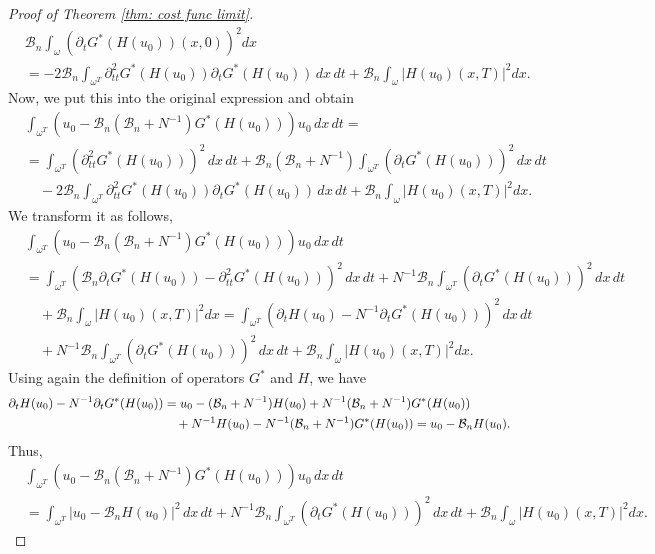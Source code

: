 \documentclass[reqno]{amsart}
\begin{document}
\begin{proof}[Proof of Theorem \ref{thm: cost func limit}]
\begin{align*}
&\mathcal{B}_n\int _{\omega }(\partial _{t}G^{\ast
}(H(u_0))(x,0))^2{dx} \\
&=-2\mathcal{B}_n\int _{\omega ^{T}}\partial _{tt}^2G^{\ast
}(H(u_0))\partial _{t}G^{\ast }(H(u_0))\,dx\,dt + \mathcal{B}_n\int
_{\omega }|H(u_0)(x,T)|^2{dx}.
\end{align*}
Now, we put this into the original expression and obtain
\begin{align*}
&\int _{\omega ^{T}}(u_0-\mathcal{B}_n(\mathcal{B}%
_n+N^{-1})G^{\ast }(H(u_0)))u_0\,dx\,dt= \\
&=\int _{\omega ^{T}}(\partial _{tt}^2G^{\ast }(H(u_0)))^2\,dx\,dt+%
\mathcal{B}_n(\mathcal{B}_n+N^{-1})\int _{\omega ^{T}}(\partial
_{t}G^{\ast }(H(u_0)))^2\,dx\,dt \\
&\quad -2\mathcal{B}_n\int _{\omega ^{T}}\partial _{tt}^2G^{\ast
}(H(u_0))\partial _{t}G^{\ast }(H(u_0))\,dx\,dt +\mathcal{B}_n\int
_{\omega }|H(u_0)(x,T)|^2{dx}.
\end{align*}
We transform it as follows,
\begin{align*}
&\int _{\omega ^{T}}(u_0-\mathcal{B}_n(\mathcal{B}%
_n+N^{-1})G^{\ast }(H(u_0)))u_0\,dx\,dt \\
&=\int _{\omega ^{T}}(\mathcal{B}_n\partial _{t}G^{\ast
}(H(u_0))-\partial _{tt}^2G^{\ast }(H(u_0)))^2\,dx\,dt+N^{-1}\mathcal{B%
}_n\int _{\omega ^{T}}(\partial _{t}G^{\ast }(H(u_0)))^2\,dx\,dt
\\
&\quad +\mathcal{B}_n\int _{\omega }|H(u_0)(x,T)|^2{dx}=\int
_{\omega ^{T}}(\partial _{t}H(u_0)-N^{-1}\partial _{t}G^{\ast
}(H(u_0)))^2\,dx\,dt \\
&\quad +N^{-1}\mathcal{B}_n\int _{\omega ^{T}}(\partial _{t}G^{\ast
}(H(u_0)))^2\,dx\,dt+\mathcal{B}_n\int _{\omega
}|H(u_0)(x,T)|^2{dx}.
\end{align*}
Using again the definition of operators $G^{\ast }$ and $H$, we have
\begin{align*}
\partial _{t}H(u_0)-N^{-1}\partial _{t}G^{\ast }(H(u_0))
&=u_0-(\mathcal{%
B}_n+N^{-1})H(u_0)+N^{-1}(\mathcal{B}_n+N^{-1})G^{\ast }(H(u_0)) \\
&\quad +N^{-1}H(u_0)-N^{-1}(\mathcal{B}_n+N^{-1})G^{\ast }(H(u_0))=u_0-
\mathcal{B}_nH(u_0).
\end{align*}
Thus,
\begin{align*}
&\int _{\omega ^{T}}(u_0-\mathcal{B}_n(\mathcal{B}%
_n+N^{-1})G^{\ast }(H(u_0)))u_0\,dx\,dt \\
&=\int _{\omega ^{T}}|u_0-\mathcal{B}_nH(u_0)|^2\,dx\,dt+N^{-1}%
\mathcal{B}_n\int _{\omega ^{T}}(\partial _{t}G^{\ast
}(H(u_0)))^2\,dx\,dt+\mathcal{B}_n\int _{\omega
}|H(u_0)(x,T)|^2{dx}.
\end{align*}


\end{proof}
\end{document}
